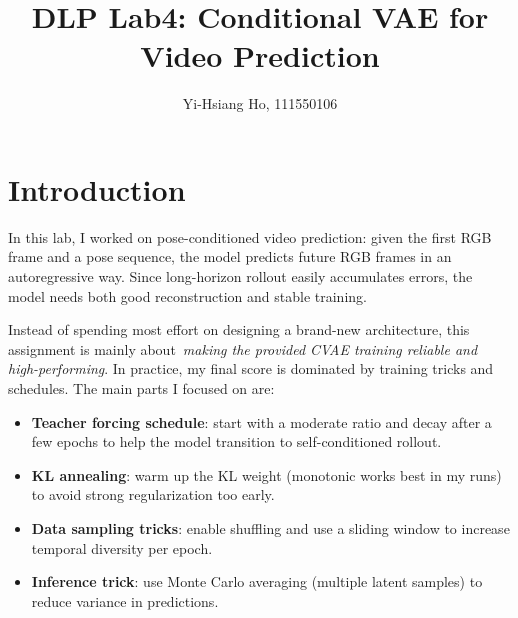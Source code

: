 \documentclass[10pt,twocolumn,letterpaper]{article}
\begin{document}
\title{DLP Lab4: Conditional VAE for Video Prediction}

\author{Yi-Hsiang Ho, 111550106
}
\maketitle


\section{Introduction}
\label{sec:lab4_intro}

In this lab, I worked on pose-conditioned video prediction: given the first RGB
frame and a pose sequence, the model predicts future RGB frames in an
autoregressive way. Since long-horizon rollout easily accumulates errors, the
model needs both good reconstruction and stable training.

Instead of spending most effort on designing a brand-new architecture, this
assignment is mainly about \,\emph{making the provided CVAE training reliable and
high-performing}. In practice, my final score is dominated by training tricks
and schedules. The main parts I focused on are:
\begin{itemize}[itemsep=1pt]
  \item \textbf{Teacher forcing schedule}: start with a moderate ratio and decay
    after a few epochs to help the model transition to self-conditioned rollout.
  \item \textbf{KL annealing}: warm up the KL weight (monotonic works best in my
    runs) to avoid strong regularization too early.
  \item \textbf{Data sampling tricks}: enable shuffling and use a sliding window
    to increase temporal diversity per epoch.
  \item \textbf{Inference trick}: use Monte Carlo averaging (multiple latent
    samples) to reduce variance in predictions.
\end{itemize}
\end{document}
